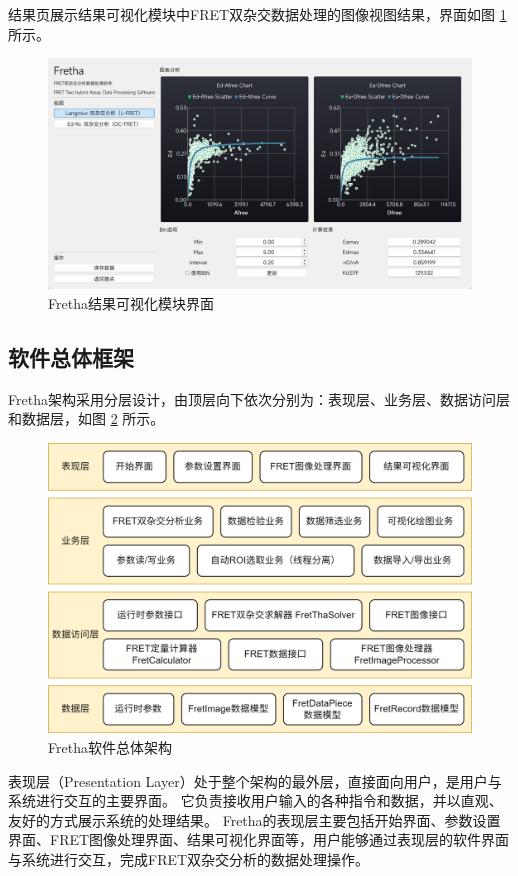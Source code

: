 结果页展示结果可视化模块中FRET双杂交数据处理的图像视图结果，界面如图 \ref{fig:Fretha结果可视化模块界面} 所示。
\begin{figure}[hbtp]
  \centering
  \includegraphics[width=0.9\linewidth]{../figures/2/2_结果可视化.png}
  \caption{Fretha结果可视化模块界面}
  \label{fig:Fretha结果可视化模块界面}
\end{figure}

\subsection{软件总体框架}

Fretha架构采用分层设计，由顶层向下依次分别为：表现层、业务层、数据访问层和数据层，如图 \ref{fig:fretha_arch} 所示。

\begin{figure}[hbtp]
    \centering
    \includegraphics[width=0.9\linewidth]{../figures/2/2_Fretha架构.png}
    \caption{Fretha软件总体架构}
    \label{fig:fretha_arch}
\end{figure}

表现层（Presentation Layer）处于整个架构的最外层，直接面向用户，是用户与系统进行交互的主要界面。
它负责接收用户输入的各种指令和数据，并以直观、友好的方式展示系统的处理结果。
Fretha的表现层主要包括开始界面、参数设置界面、FRET图像处理界面、结果可视化界面等，用户能够通过表现层的软件界面与系统进行交互，完成FRET双杂交分析的数据处理操作。

